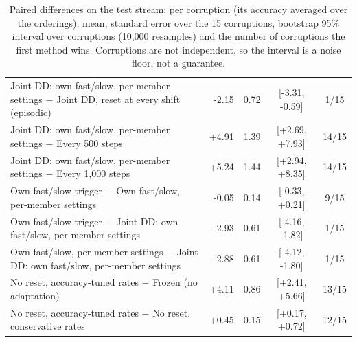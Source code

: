 \begin{table}[t]
\begin{tabular}{@{}lrrcc@{}}
    Joint DD: own fast/slow, per-member settings $-$ Joint DD, reset at every shift (episodic) & -2.15 & 0.72 & [-3.31, -0.59] & 1/15 \\
    Joint DD: own fast/slow, per-member settings $-$ Every 500 steps & +4.91 & 1.39 & [+2.69, +7.93] & 14/15 \\
    Joint DD: own fast/slow, per-member settings $-$ Every 1,000 steps & +5.24 & 1.44 & [+2.94, +8.35] & 14/15 \\
    Own fast/slow trigger $-$ Own fast/slow, per-member settings & -0.05 & 0.14 & [-0.33, +0.21] & 9/15 \\
    Own fast/slow trigger $-$ Joint DD: own fast/slow, per-member settings & -2.93 & 0.61 & [-4.16, -1.82] & 1/15 \\
    Own fast/slow, per-member settings $-$ Joint DD: own fast/slow, per-member settings & -2.88 & 0.61 & [-4.12, -1.80] & 1/15 \\
    No reset, accuracy-tuned rates $-$ Frozen (no adaptation) & +4.11 & 0.86 & [+2.41, +5.66] & 13/15 \\
    No reset, accuracy-tuned rates $-$ No reset, conservative rates & +0.45 & 0.15 & [+0.17, +0.72] & 12/15 \\
    \bottomrule
  \end{tabular}
  \caption{Paired differences on the test stream: per corruption (its accuracy averaged over the orderings), mean, standard error over the 15 corruptions, bootstrap 95\% interval over corruptions (10,000 resamples) and the number of corruptions the first method wins. Corruptions are not independent, so the interval is a noise floor, not a guarantee.}
  \label{tab:final_paired}
\end{table}
